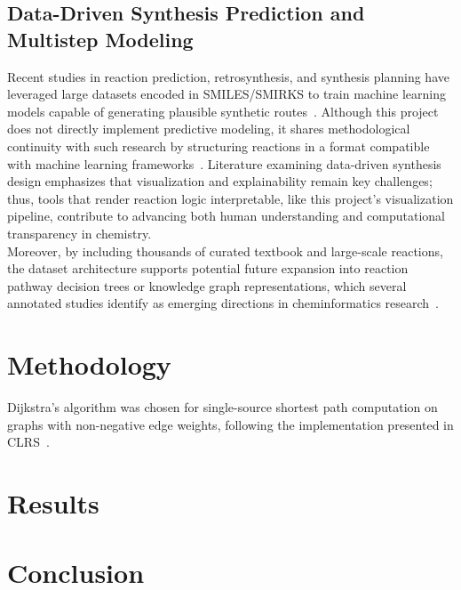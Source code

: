 \documentclass[12pt]{article}
\begin{document}
\subsection{Data-Driven Synthesis Prediction and Multistep Modeling}
\indent
Recent studies in reaction prediction, retrosynthesis, and synthesis planning have leveraged large datasets encoded in SMILES/SMIRKS to train machine learning models capable of generating plausible synthetic routes~\cite{dai2019retrosynthesis}.
Although this project does not directly implement predictive modeling, it shares methodological continuity with such research by structuring reactions in a format compatible with machine learning frameworks~\cite{hormazabal2022cede}.
Literature examining data-driven synthesis design emphasizes that visualization and explainability remain key challenges; thus, tools that render reaction logic interpretable, like this project’s visualization pipeline, contribute to advancing both human understanding and computational transparency in chemistry.
\\
\indent
Moreover, by including thousands of curated textbook and large-scale reactions, the dataset architecture supports potential future expansion into reaction pathway decision trees or knowledge graph representations, which several annotated studies identify as emerging directions in cheminformatics research~\cite{10.1016/j.tcs.2025.115344}.

\section{Methodology}
Dijkstra's algorithm was chosen for single-source shortest path computation on graphs with non-negative edge weights, following the implementation presented in CLRS~\cite{clrsAlgorithms}.

\section{Results}

\section{Conclusion}



\end{document}
